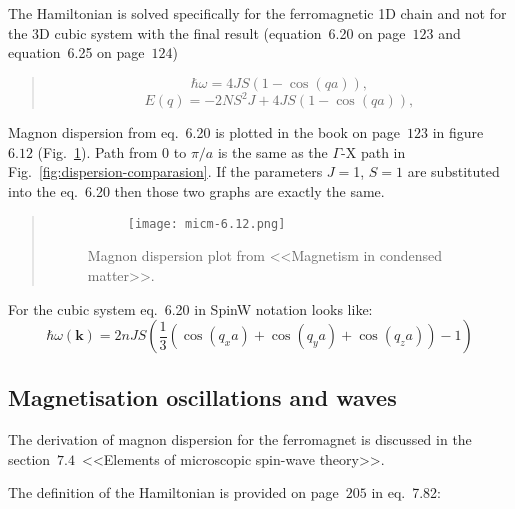     The Hamiltonian is solved specifically for the ferromagnetic 1D chain and not for the 3D cubic system with the final result (equation~6.20 on page~$123$ and equation~6.25 on page~$124$)
    \begin{quote}
        \begin{equation}
            \hbar\omega = 4JS(1 - \cos(qa)), \label{eq:micm-6.20} \tag{6.20}
        \end{equation}
        \begin{equation}
           E(q) = -2NS^2J + 4JS(1 - \cos(qa)), \label{eq:micm-6.25} \tag{6.25}
        \end{equation}
    \end{quote}
    Magnon dispersion from eq.~6.20 is plotted in the book on page~$123$ in figure~$6.12$ (Fig.~\ref{fig:micm-6.12}). 
    Path from $0$ to $\pi / a$ is the same as the $\Gamma$-X path in Fig.~\ref{fig:dispersion-comparasion}. 
    If the parameters $J = $1, $S = 1$ are substituted into the eq.~6.20 then those two graphs are exactly the same.
    \begin{quote}
        \begin{figure}[H]
            \centering
            \begin{subfigure}[b]{0.5\textwidth}
                \centering
                \texttt{[image: micm-6.12.png]}
            \end{subfigure}
            \hfill
            \caption{Magnon dispersion plot from <<Magnetism in condensed matter>>.}
            \label{fig:micm-6.12}
        \end{figure}
    \end{quote}
    For the cubic system eq.~6.20 in SpinW notation looks like:
    \begin{equation}
        \hbar\omega(\boldsymbol{k}) = 2nJS(\dfrac{1}{3}(\cos(q_xa) + \cos(q_ya) + \cos(q_za)) - 1)
    \end{equation}

\subsection{Magnetisation oscillations and waves \cite{gurevich1996magnetization}}
    The derivation of magnon dispersion for the ferromagnet is discussed in the section~$7.4$~<<Elements of microscopic spin-wave theory>>.

    The definition of the Hamiltonian is provided on page~$205$ in eq.~7.82:

